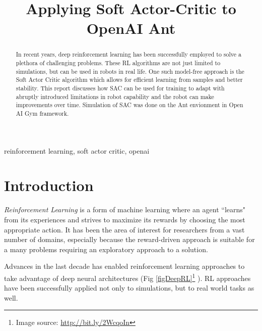 \documentclass[conference]{IEEEtran}
\begin{document}
\title{Applying Soft Actor-Critic to OpenAI Ant\\
}

\author{
}

\maketitle

\begin{abstract}
In recent years, deep reinforcement learning has been successfully employed to solve a plethora of challenging problems. These RL algorithms are not just limited to simulations, but can be used in robots in real life. One such model-free approach is the Soft Actor Critic algorithm which allows for efficient learning from samples and better stability. This report discusses how SAC can be used for training to adapt with abruptly introduced limitations in robot capability and the robot can make improvements over time. Simulation of SAC was done on the Ant envionment in Open AI Gym framework.\\

\end{abstract}

\begin{IEEEkeywords}
reinforcement learning, soft actor critic, openai
\end{IEEEkeywords}

\section{Introduction}
\emph{Reinforcement Learning} is a form of machine learning where an agent ``learns" from its experiences and strives to maximize its rewards by choosing the most appropriate action. It has been the area of interest for researchers from a vast number of domains, especially because the reward-driven approach is suitable for a many problems requiring an exploratory approach to a solution.

Advances in the last decade has enabled reinforcement learning approaches to take advantage of deep neural architectures (Fig \ref{figDeepRL}\footnote{Image source: \url{http://bit.ly/2WcqoIn}} ). RL approaches have been successfully applied not only to simulations\cite{mnih2015humanlevel}, but to real world tasks\cite{DBLP:journals/corr/abs-1812-00568} as well. 
\end{document}
